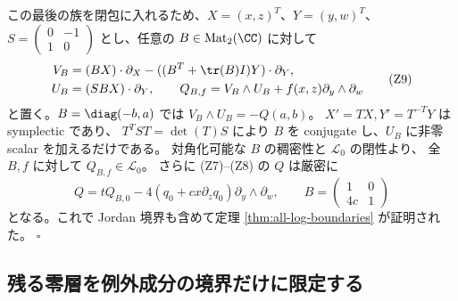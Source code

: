 この最後の族を閉包に入れるため、$X=(x,z)^T$、$Y=(y,w)^T$、
$S=\left(\begin{smallmatrix}0&-1\\1&0\end{smallmatrix}\right)$ とし、任意の
$B\in\operatorname{Mat}_2(\CC)$ に対して
\[
\begin{split}
 V_B&=(BX)\cdot\partial_X-((B^T+\tr(B)I)Y)\cdot\partial_Y,\\
 U_B&=(SBX)\cdot\partial_Y,\qquad
 Q_{B,f}=V_B\wedge U_B+f(x,z)\partial_y\wedge\partial_w
\end{split}\tag{Z9}\label{eq:zero-matrix-family}
\]
と置く。$B=\diag(-b,a)$ では $V_B\wedge U_B=-Q(a,b)$。
$X'=TX,Y'=T^{-T}Y$ は symplectic であり、
$T^TST=\det(T)S$ により $B$ を conjugate し、$U_B$ に非零 scalar を加えるだけである。
対角化可能な $B$ の稠密性と $\mathcal L_0$ の閉性より、
全 $B,f$ に対して $Q_{B,f}\in\mathcal L_0$。
さらに (Z7)--(Z8) の $Q$ は厳密に
\[
 Q=tQ_{B,0}-4(q_0+cx\partial_zq_0)\partial_y\wedge\partial_w,
 \qquad B=\begin{pmatrix}1&0\\4c&1\end{pmatrix}              \tag{Z10}
\]
となる。これで Jordan 境界も含めて定理 \ref{thm:all-log-boundaries} が証明された。
\hfill$\square$

\subsection{残る零層を例外成分の境界だけに限定する}

